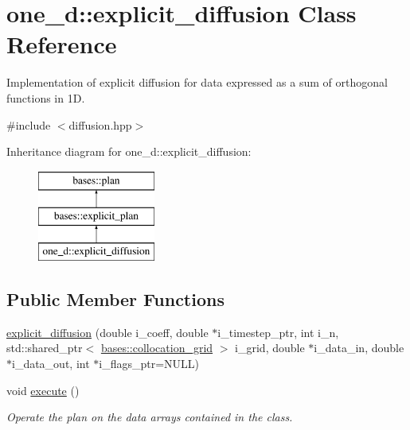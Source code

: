 \hypertarget{classone__d_1_1explicit__diffusion}{\section{one\-\_\-d\-:\-:explicit\-\_\-diffusion Class Reference}
\label{classone__d_1_1explicit__diffusion}
}


Implementation of explicit diffusion for data expressed as a sum of orthogonal functions in 1\-D.  




{\ttfamily \#include $<$diffusion.\-hpp$>$}

Inheritance diagram for one\-\_\-d\-:\-:explicit\-\_\-diffusion\-:\begin{figure}[H]
\begin{center}
\leavevmode
\includegraphics[height=3.000000cm]{classone__d_1_1explicit__diffusion}
\end{center}
\end{figure}
\subsection*{Public Member Functions}
\begin{DoxyCompactItemize}
\item 
\hyperlink{classone__d_1_1explicit__diffusion_ae60fd679e527d831457d416918da4622}{explicit\-\_\-diffusion} (double i\-\_\-coeff, double $\ast$i\-\_\-timestep\-\_\-ptr, int i\-\_\-n, std\-::shared\-\_\-ptr$<$ \hyperlink{classbases_1_1collocation__grid}{bases\-::collocation\-\_\-grid} $>$ i\-\_\-grid, double $\ast$i\-\_\-data\-\_\-in, double $\ast$i\-\_\-data\-\_\-out, int $\ast$i\-\_\-flags\-\_\-ptr=N\-U\-L\-L)
\item 
void \hyperlink{classone__d_1_1explicit__diffusion_a655f3d93ce9b6589ae7ecd3fc70ad92d}{execute} ()
\begin{DoxyCompactList}\small\item\em Operate the plan on the data arrays contained in the class. \end{DoxyCompactList}\end{DoxyCompactItemize}
